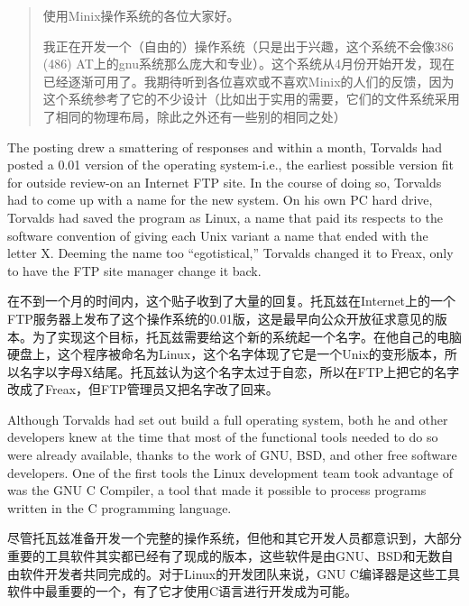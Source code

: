 \ifdefined\chs
\begin{quote}
使用Minix操作系统的各位大家好。

我正在开发一个（自由的）操作系统（只是出于兴趣，这个系统不会像386 (486) AT上的gnu系统那么庞大和专业）。这个系统从4月份开始开发，现在已经逐渐可用了。我期待听到各位喜欢或不喜欢Minix的人们的反馈，因为这个系统参考了它的不少设计（比如出于实用的需要，它们的文件系统采用了相同的物理布局，除此之外还有一些别的相同之处）
\end{quote}
\fi

\ifdefined\eng
The posting drew a smattering of responses and within a month, Torvalds had posted a 0.01 version of the operating system-i.e., the earliest possible version fit for outside review-on an Internet FTP site. In the course of doing so, Torvalds had to come up with a name for the new system. On his own PC hard drive, Torvalds had saved the program as Linux, a name that paid its respects to the software convention of giving each Unix variant a name that ended with the letter X. Deeming the name too ``egotistical,'' Torvalds changed it to Freax, only to have the FTP site manager change it back.
\fi

\ifdefined\chs
在不到一个月的时间内，这个贴子收到了大量的回复。托瓦兹在Internet上的一个FTP服务器上发布了这个操作系统的0.01版，这是最早向公众开放征求意见的版本。为了实现这个目标，托瓦兹需要给这个新的系统起一个名字。在他自己的电脑硬盘上，这个程序被命名为Linux，这个名字体现了它是一个Unix的变形版本，所以名字以字母X结尾。托瓦兹认为这个名字太过于自恋，所以在FTP上把它的名字改成了Freax，但FTP管理员又把名字改了回来。
\fi

\ifdefined\eng
Although Torvalds had set out build a full operating system, both he and other developers knew at the time that most of the functional tools needed to do so were already available, thanks to the work of GNU, BSD, and other free software developers. One of the first tools the Linux development team took advantage of was the GNU C Compiler, a tool that made it possible to process programs written in the C programming language.
\fi

\ifdefined\chs
尽管托瓦兹准备开发一个完整的操作系统，但他和其它开发人员都意识到，大部分重要的工具软件其实都已经有了现成的版本，这些软件是由GNU、BSD和无数自由软件开发者共同完成的。对于Linux的开发团队来说，GNU C编译器是这些工具软件中最重要的一个，有了它才使用C语言进行开发成为可能。
\fi

